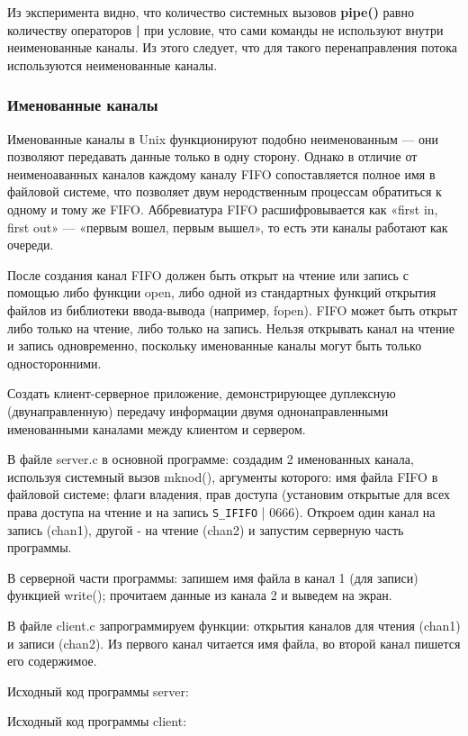 \documentclass[a4paper]{article}
\begin{document}
	Из эксперимента видно, что количество системных вызовов \textbf{pipe()} равно количеству операторов \textbf{|} при условие, что сами команды не используют внутри неименованные каналы. Из этого следует, что для такого перенаправления потока используются неименованные каналы.
	
	\subsubsection{Именованные каналы}
	Именованные каналы в Unix функционируют подобно неименованным — они позволяют передавать данные только в одну сторону. Однако в отличие от неименоаванных каналов каждому каналу FIFO сопоставляется полное имя в файловой системе, что позволяет двум неродственным процессам обратиться к одному и тому же FIFO. Аббревиатура FIFO расшифровывается как «first in, first out» — «первым вошел, первым вышел», то есть эти каналы работают как очереди.
	
	После создания канал FIFO должен быть открыт на чтение или запись с помощью либо функции open, либо одной из стандартных функций открытия файлов из библиотеки ввода-вывода (например, fopen). FIFO может быть открыт либо только на чтение, либо только на запись. Нельзя открывать канал на чтение и запись одновременно, поскольку именованные каналы могут быть только односторонними.

	Создать клиент-серверное приложение, демонстрирующее дуплексную (двунаправленную) передачу информации двумя однонаправленными именованными каналами между клиентом и сервером.
	
	В файле server.c в основной программе: создадим 2 именованных канала, используя системный вызов mknod(), аргументы которого: имя файла FIFO в файловой системе; флаги владения, прав доступа (установим открытые для всех права доступа на чтение и на запись \texttt{S\_IFIFO} | 0666). Откроем один канал на запись (chan1), другой - на чтение (chan2) и запустим серверную часть программы.
	
	В серверной части программы: запишем имя файла в канал 1 (для записи) функцией write(); прочитаем данные из канала 2 и выведем на экран.

	В файле client.c запрограммируем функции: открытия каналов для чтения (chan1) и записи (chan2). Из первого канал читается имя файла, во второй канал пишется его содержимое.
	
	Исходный код программы server:
	
		
	Исходный код программы client:
	
	
\end{document}

